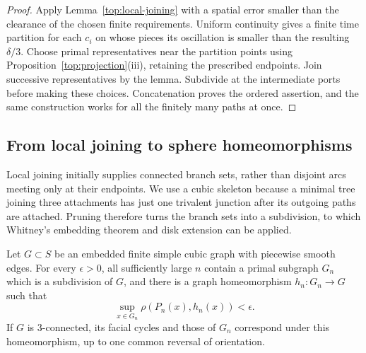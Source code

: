 \begin{proof}
Apply Lemma~\ref{top:local-joining} with a spatial error smaller than
the clearance of the chosen finite requirements.  Uniform continuity
gives a finite time partition for each $c_i$ on whose pieces its
oscillation is smaller than the resulting $\delta/3$.  Choose primal
representatives near the partition points using
Proposition~\ref{top:projection}(iii), retaining the prescribed endpoints.
Join successive representatives by the lemma.  Subdivide at the
intermediate ports before making these choices.  Concatenation proves
the ordered assertion, and the same construction works for all the
finitely many paths at once.
\end{proof}

\subsection{From local joining to sphere homeomorphisms}

Local joining initially supplies connected branch sets, rather than
disjoint arcs meeting only at their endpoints.  We use a cubic
skeleton because a minimal tree joining three attachments has just
one trivalent junction after its outgoing paths are attached.
Pruning therefore turns the branch sets into a subdivision, to which
Whitney's embedding theorem and disk extension can be applied.

\begin{lemma}\label{top:skeleton-lift}
Let $G\subset S$ be an embedded finite simple cubic graph with
piecewise smooth edges.  For every $\epsilon>0$, all sufficiently large
$n$ contain a primal subgraph $G_n$ which is a subdivision of $G$, and
there is a graph homeomorphism $h_n:G_n\to G$ such that
\[
 \sup_{x\in G_n}\rho(P_n(x),h_n(x))<\epsilon.
\]
If $G$ is $3$-connected, its facial cycles and those of $G_n$ correspond
under this homeomorphism, up to one common reversal of orientation.
\end{lemma}

